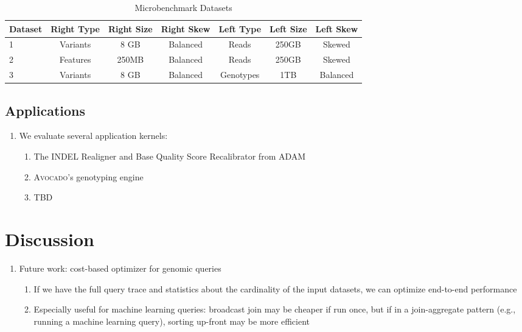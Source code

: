 \documentclass{vldb}
\begin{document}
\begin{table*}[t]
\centering
\caption{Microbenchmark Datasets}
\label{tab:microbenchmarks}
\begin{tabular}{ l | c c c | c c c }
\hline
Dataset & Right Type & Right Size & Right Skew & Left Type & Left Size & Left Skew \\
\hline
\hline
1 & Variants & 8 GB & Balanced & Reads & 250GB & Skewed \\
2 & Features & 250MB & Balanced & Reads & 250GB & Skewed \\
3 & Variants & 8 GB & Balanced & Genotypes & 1TB & Balanced \\
\hline
\end{tabular}
\end{table*}

\subsection{Applications}
\label{sec:applications}

\begin{enumerate}
\item We evaluate several application kernels:
\begin{enumerate}
\item The INDEL Realigner and Base Quality Score Recalibrator from
\textsc{ADAM}~\cite{massie13, nothaft15}
\item \textsc{Avocado}'s genotyping engine~\cite{nothaft15avocado, nothaft17}
\item TBD
\end{enumerate}
\end{enumerate}

\section{Discussion}
\label{sec:discussion}

\begin{enumerate}
\item Future work: cost-based optimizer for genomic queries
\begin{enumerate}
\item If we have the full query trace and statistics about the cardinality of
the input datasets, we can optimize end-to-end performance
\item Especially useful for machine learning queries: broadcast join may be
cheaper if run once, but if in a join-aggregate pattern (e.g., running a
machine learning query), sorting up-front may be more efficient
\end{enumerate}
\end{enumerate}
\end{document}
